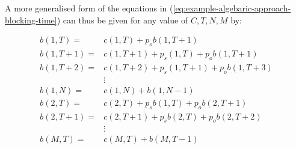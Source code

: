 A more generalised form of the equations in 
(\ref{eq:example-algebaric-approach-blocking-time})
can thus be given for any value of \(C,T,N,M\) by:

\begin{align}
    b(1,T) =& c(1, T) + p_o b(1, T + 1) \label{eq:first_eq_of_blocking_general}\\
    b(1,T + 1) =& c(1, T + 1) + p_s(1, T) + p_o b(1, T + 1) \\
    b(1,T + 2) =& c(1, T + 2) + p_s(1, T + 1) + p_o b(1, T + 3) \\
    & \vdots \nonumber \\
    b(1, N) =& c(1, N) + b(1, N - 1) \\
    b(2, T) =& c(2, T) + p_s b(1, T) + p_o b(2, T + 1) \\
    b(2, T + 1) =& c(2, T + 1) + p_s b(2, T) + p_o b(2, T + 2) \\
    & \vdots \nonumber \\
    b(M, T) =& c(M, T) + b(M, T-1) \label{eq:last_eq_of_blocking_general}
\end{align}

